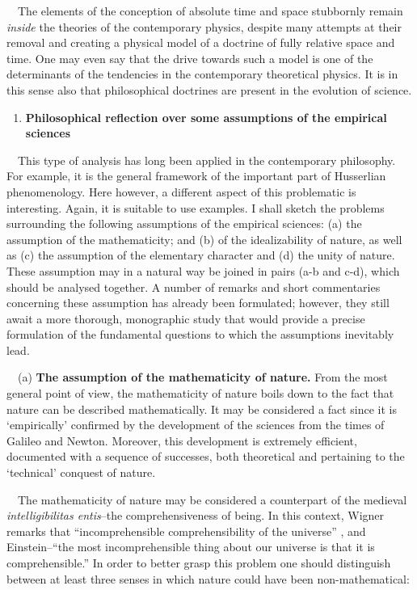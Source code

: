 \documentclass[a4paper]{article}
\begin{document}
\ \ The elements of the conception of absolute time and space stubbornly remain \textit{inside} the theories of the
contemporary physics, despite many attempts at their removal and creating a physical model of a doctrine of fully
relative space and time. One may even say that the drive towards such a model is one of the determinants of the
tendencies in the contemporary theoretical physics. It is in this sense also that philosophical doctrines are present
in the evolution of science.

\begin{enumerate}
\item {\bfseries
Philosophical reflection over some assumptions of the empirical sciences}
\end{enumerate}
\ \ This type of analysis has long been applied in the contemporary philosophy. For example, it is the general framework
of the important part of Husserlian phenomenology. Here however, a different aspect of this problematic is interesting.
Again, it is suitable to use examples. I shall sketch the problems surrounding the following assumptions of the
empirical sciences: (a) the assumption of the mathematicity; and (b) of the idealizability of nature, as well as (c)
the assumption of the elementary character and (d) the unity of nature. These assumption may in a natural way be joined
in pairs (a-b and c-d), which should be analysed together. A number of remarks and short commentaries concerning these
assumption has already been formulated; however, they still await a more thorough, monographic study that would provide
a precise formulation of the fundamental questions to which the assumptions inevitably lead.

\ \ (a) \textbf{The assumption of the mathematicity of nature.} From the most  general point of view, the mathematicity
of nature boils down to the fact that nature can be described mathematically. It may be considered a fact since it is
‘empirically’ confirmed by the development of the sciences from the times of Galileo and Newton. Moreover, this
development is extremely efficient, documented with a sequence of successes, both theoretical and pertaining to the
‘technical’ conquest of nature.

\ \ The mathematicity of nature may be considered a counterpart of the medieval \textit{intelligibilitas entis}–the
comprehensiveness of being. In this context, %
Wigner remarks that “incomprehensible comprehensibility of the universe” , and Einstein–“the most incomprehensible thing
about our universe is that it is comprehensible.” In order to better grasp this problem one should distinguish between
at least three senses in which nature could have been non-mathematical:
\end{document}
